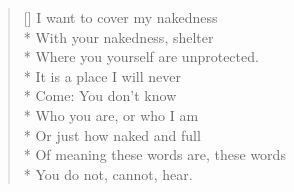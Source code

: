 \label{ch:unspoken}
\settowidth{\versewidth}{Of meaning these words are, these words}
\begin{verse}[\versewidth]
I want to cover my nakedness\\*
With your nakedness, shelter\\*
Where you yourself are unprotected.\\*
It is a place I will never \\*
Come: You don't know\\*
Who you are, or who I am\\*
Or just how naked and full\\*
Of meaning these words are, these words\\*
You do not, cannot, hear.
\end{verse}
